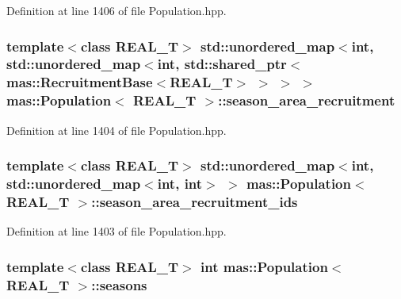 Definition at line 1406 of file Population.\-hpp.

\hypertarget{classmas_1_1_population_a4447806c7275aaf07e7d205c94754405}{
\subsubsection[{season\-\_\-area\-\_\-recruitment}]{\setlength{\rightskip}{0pt plus 5cm}template$<$class R\-E\-A\-L\-\_\-\-T$>$ std\-::unordered\-\_\-map$<$int, std\-::unordered\-\_\-map$<$int, std\-::shared\-\_\-ptr$<${\bf mas\-::\-Recruitment\-Base}$<$R\-E\-A\-L\-\_\-\-T$>$ $>$ $>$ $>$ {\bf mas\-::\-Population}$<$ R\-E\-A\-L\-\_\-\-T $>$\-::season\-\_\-area\-\_\-recruitment}}\label{classmas_1_1_population_a4447806c7275aaf07e7d205c94754405}


Definition at line 1404 of file Population.\-hpp.

\hypertarget{classmas_1_1_population_ada1429ef3172d164cffc39fce103454b}{
\subsubsection[{season\-\_\-area\-\_\-recruitment\-\_\-ids}]{\setlength{\rightskip}{0pt plus 5cm}template$<$class R\-E\-A\-L\-\_\-\-T$>$ std\-::unordered\-\_\-map$<$int, std\-::unordered\-\_\-map$<$int, int$>$ $>$ {\bf mas\-::\-Population}$<$ R\-E\-A\-L\-\_\-\-T $>$\-::season\-\_\-area\-\_\-recruitment\-\_\-ids}}\label{classmas_1_1_population_ada1429ef3172d164cffc39fce103454b}


Definition at line 1403 of file Population.\-hpp.

\hypertarget{classmas_1_1_population_a3ff65a37b33f558530ed8fa065d79eb6}{
\subsubsection[{seasons}]{\setlength{\rightskip}{0pt plus 5cm}template$<$class R\-E\-A\-L\-\_\-\-T$>$ int {\bf mas\-::\-Population}$<$ R\-E\-A\-L\-\_\-\-T $>$\-::seasons}}\label{classmas_1_1_population_a3ff65a37b33f558530ed8fa065d79eb6}


